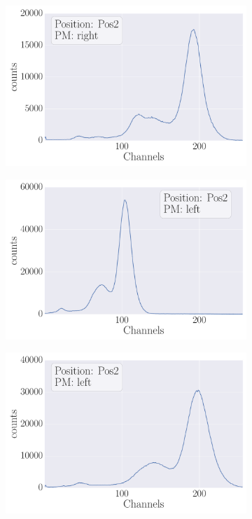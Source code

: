 \begin{figure}[H]
\begin{subfigure}[b]{\picwidth}
        \includegraphics[width=\textwidth]{analysis/figures/plot2_1c}
        \caption{}
    \end{subfigure}
    \begin{subfigure}[b]{\picwidth}
        \includegraphics[width=\textwidth]{analysis/figures/plot2_1d}
        \caption{}
    \end{subfigure}
    \begin{subfigure}[b]{\picwidth}
        \includegraphics[width=\textwidth]{analysis/figures/plot2_1e}

\end{subfigure}
\end{figure}
